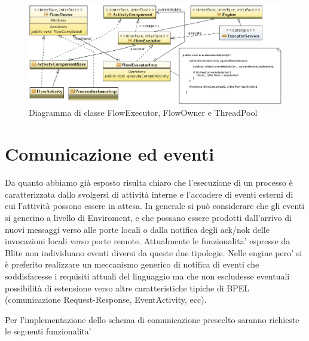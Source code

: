 \begin{figure}[p]
\begin{center}
\includegraphics[angle=90,scale=0.75]
{architettura_interna/dia/flowClassDiagram}
\caption[Diagramma di classe FlowExecutor \ldots] {
   	\textsf{{\small Diagramma di classe FlowExecutor, FlowOwner e ThreadPool}} }
  \label{fig:flowclass}
\end{center}
\end{figure}

\section{Comunicazione ed eventi}
Da quanto abbiamo già esposto risulta chiaro che l'esecuzione di un processo \`e
caratterizzata dallo svolgersi di attività interne e l'accadere di eventi
esterni di cui l'attività possono essere in attesa. In generale si può
considerare che gli eventi si generino a livello di Enviroment, e che possano
essere prodotti dall'arrivo di nuovi messaggi verso alle porte locali o
dalla notifica degli ack/nok delle invocazioni locali
verso porte remote. Attualmente le funzionalita' espresse da Blite non
individuano eventi diversi da queste due tipologie. Nelle engine pero' si \`e
preferito realizzare un meccanismo generico di notifica di eventi che
soddisfacesse i requisiti attuali del linguaggio ma che non escludesse eventuali
possibilità di estensione verso altre caratteristiche tipiche di BPEL
(comunicazione Request-Response, EventActivity, ecc).

Per l'implementazione dello schema di comunicazione prescelto saranno richieste
le seguenti funzionalita'

